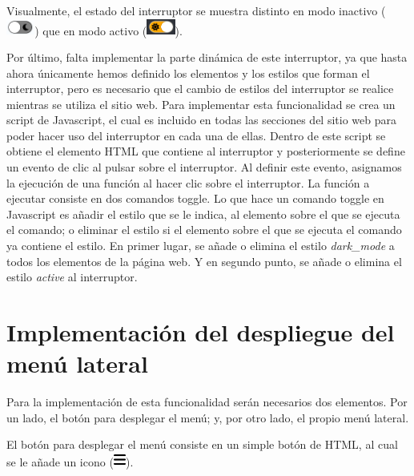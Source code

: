 Visualmente, el estado del interruptor se muestra distinto en modo inactivo (\includegraphics[width=0.07\textwidth]{imagenes/07_Implementacion/switch_inactive.png}) que en modo activo (\includegraphics[width=0.07\textwidth]{imagenes/07_Implementacion/switch_active.png}).

Por último, falta implementar la parte dinámica de este interruptor, ya que hasta ahora únicamente hemos definido los elementos y los estilos que forman el interruptor, pero es necesario que el cambio de estilos del interruptor se realice mientras se utiliza el sitio web. Para implementar esta funcionalidad se crea un script de Javascript, el cual es incluido en todas las secciones del sitio web para poder hacer uso del interruptor en cada una de ellas. Dentro de este script se obtiene el elemento HTML que contiene al interruptor y posteriormente se define un evento de clic al pulsar sobre el interruptor. Al definir este evento, asignamos la ejecución de una función al hacer clic sobre el interruptor. La función a ejecutar consiste en dos comandos toggle. Lo que hace un comando toggle en Javascript es añadir el estilo que se le indica, al elemento sobre el que se ejecuta el comando; o eliminar el estilo si el elemento sobre el que se ejecuta el comando ya contiene el estilo. En primer lugar, se añade o elimina el estilo \textit{dark\_mode} a todos los elementos de la página web. Y en segundo punto, se añade o elimina el estilo \textit{active} al interruptor.

\section{Implementación del despliegue del menú lateral} \label{sec:despli_menu_lateral}

Para la implementación de esta funcionalidad serán necesarios dos elementos. Por un lado, el botón para desplegar el menú; y, por otro lado, el propio menú lateral.

El botón para desplegar el menú consiste en un simple botón de HTML, al cual se le añade un icono (\includegraphics[width=0.03\textwidth]{imagenes/07_Implementacion/bars-solid.png}).

